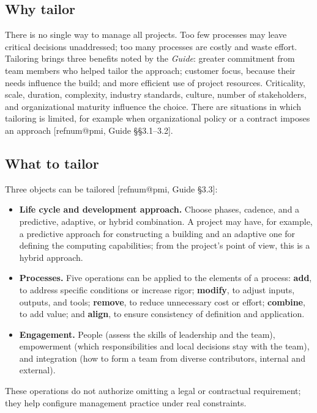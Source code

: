 \documentclass[11pt,a4paper]{article}
\makeatletter
\newcommand{\refnum}[1]{\csname refnum@#1\endcsname}
\makeatother
\begin{document}
\subsection{Why tailor}

There is no single way to manage all projects. Too few processes may leave critical decisions unaddressed; too many processes are costly and waste effort. Tailoring brings three benefits noted by the \textit{Guide}: greater commitment from team members who helped tailor the approach; customer focus, because their needs influence the build; and more efficient use of project resources. Criticality, scale, duration, complexity, industry standards, culture, number of stakeholders, and organizational maturity influence the choice. There are situations in which tailoring is limited, for example when organizational policy or a contract imposes an approach [\refnum{pmi}, Guide §§3.1–3.2].
\subsection{What to tailor}

Three objects can be tailored [\refnum{pmi}, Guide §3.3]:

\begin{itemize}
\item \textbf{Life cycle and development approach.} Choose phases, cadence, and a predictive, adaptive, or hybrid combination. A project may have, for example, a predictive approach for constructing a building and an adaptive one for defining the computing capabilities; from the project's point of view, this is a hybrid approach.
\item \textbf{Processes.} Five operations can be applied to the elements of a process: \textbf{add}, to address specific conditions or increase rigor; \textbf{modify}, to adjust inputs, outputs, and tools; \textbf{remove}, to reduce unnecessary cost or effort; \textbf{combine}, to add value; and \textbf{align}, to ensure consistency of definition and application.
\item \textbf{Engagement.} People (assess the skills of leadership and the team), empowerment (which responsibilities and local decisions stay with the team), and integration (how to form a team from diverse contributors, internal and external).
\end{itemize}

These operations do not authorize omitting a legal or contractual requirement; they help configure management practice under real constraints.
\end{document}
